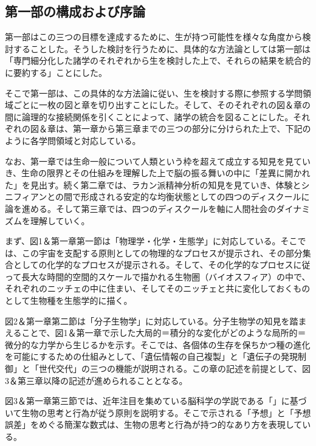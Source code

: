 \subsection{第一部の構成および序論}\label{ux7b2cux4e00ux90e8ux306eux69cbux6210ux304aux3088ux3073ux5e8fux8ad6}

第一部はこの三つの目標を達成するために、生が持つ可能性を様々な角度から検討することした。そうした検討を行うために、具体的な方法論としては第一部は「専門細分化した諸学のそれぞれから生を検討した上で、それらの結果を統合的に要約する」ことにした。

そこで第一部は、この具体的な方法論に従い、生を検討する際に参照する学問領域ごとに一枚の図と章を切り出すことにした。そして、そのそれぞれの図＆章の間に論理的な接続関係を引くことによって、諸学の統合を図ることにした。それぞれの図＆章は、第一章から第三章までの三つの部分に分けられた上で、下記のように各学問領域と対応している。

なお、第一章では生命一般について人類という枠を超えて成立する知見を見ていき、生命の限界とその仕組みを理解した上で脳の振る舞いの中に「差異に開かれた」を見出す。続く第二章では、ラカン派精神分析の知見を見ていき、体験とシニフィアンとの間で形成される安定的な均衡状態としての四つのディスクールに論を進める。そして第三章では、四つのディスクールを軸に人間社会のダイナミズムを理解していく。

まず、図1＆第一章第一節は「物理学・化学・生態学」に対応している。そこでは、この宇宙を支配する原則としての物理的なプロセスが提示され、その部分集合としての化学的なプロセスが提示される。そして、その化学的なプロセスに従って長大な時間的空間的スケールで描かれる生物圏（バイオスフィア）の中で、それぞれのニッチェの中に住まい、そしてそのニッチェと共に変化しておくものとして生物種を生態学的に描く。

図2＆第一章第二節は「分子生物学」に対応している。分子生物学の知見を踏まえることで、図1＆第一章で示した大局的＝積分的な変化がどのような局所的＝微分的な力学から生じるかを示す。そこでは、各個体の生存を保ちかつ種の進化を可能にするための仕組みとして、「遺伝情報の自己複製」と「遺伝子の発現制御」と「世代交代」の三つの機能が説明される。この章の記述を前提として、図3＆第三章以降の記述が進められることとなる。

図3＆第一章第三節では、近年注目を集めている脳科学の学説である「」に基づいて生物の思考と行為が従う原則を説明する。そこで示される「予想」と「予想誤差」をめぐる簡潔な数式は、生物の思考と行為が持つ的なあり方を表現している。

